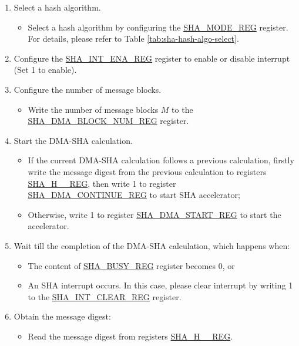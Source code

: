 \begin{enumerate}
    \item Select a hash algorithm.
    \begin{itemize}
        \item Select a hash algorithm by configuring the \hyperref[regdesc:SHAMODEREG]{SHA\_MODE\_REG} register. For details, please refer to Table \ref{tab:sha-hash-algo-select}.
    \end{itemize}
    \item Configure the \hyperref[regdesc:SHAINTENAREG]{SHA\_INT\_ENA\_REG} register to enable or disable interrupt (Set 1 to enable).
    \item Configure the number of message blocks.
    \begin{itemize}
        \item  Write the number of message blocks \begin{math}M\end{math} to the  \hyperref[regdesc:SHADMABLOCKNUMREG]{SHA\_DMA\_BLOCK\_NUM\_REG} register.
    \end{itemize}
    \item Start the DMA-SHA calculation.
        \begin{itemize}
            \item If the current DMA-SHA calculation follows a previous calculation, firstly write the message digest from the previous calculation to registers \hyperref[regdesc:SHAHNREG]{SHA\_H\_\_REG}, then write 1 to register \hyperref[regdesc:SHADMACONTINUEREG]{SHA\_DMA\_CONTINUE\_REG} to start SHA accelerator;
            \item Otherwise, write 1 to register \hyperref[regdesc:SHADMASTARTREG]{SHA\_DMA\_START\_REG} to start the accelerator.
        \end{itemize}
    \item Wait till the completion of the DMA-SHA calculation, which happens when:
        \begin{itemize}
            \item The content of \hyperref[regdesc:SHABUSYREG]{SHA\_BUSY\_REG} register becomes 0, or
            \item An SHA interrupt occurs. In this case, please clear interrupt by writing 1 to the \hyperref[regdesc:SHAINTCLEARREG]{SHA\_INT\_CLEAR\_REG} register.
        \end{itemize}
    
    \item Obtain the message digest:
    \begin{itemize}
        \item Read the message digest from registers \hyperref[regdesc:SHAHNREG]{SHA\_H\_\_REG}.
    \end{itemize}
\end{enumerate}